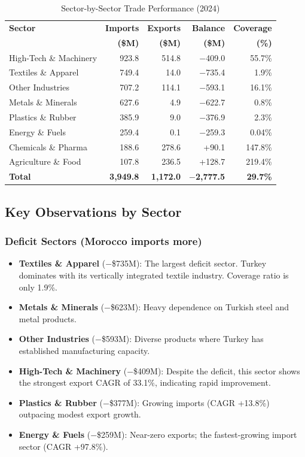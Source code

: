 \documentclass[12pt,a4paper]{article}
\begin{document}
\begin{table}[H]
\centering
\caption{Sector-by-Sector Trade Performance (2024)}
\begin{tabular}{l r r r r}
\toprule
\textbf{Sector} & \textbf{Imports} & \textbf{Exports} & \textbf{Balance} & \textbf{Coverage} \\
 & \textbf{(\$M)} & \textbf{(\$M)} & \textbf{(\$M)} & \textbf{(\%)} \\
\midrule
High-Tech \& Machinery & 923.8 & 514.8 & $-$409.0 & 55.7\% \\
Textiles \& Apparel & 749.4 & 14.0 & $-$735.4 & 1.9\% \\
Other Industries & 707.2 & 114.1 & $-$593.1 & 16.1\% \\
Metals \& Minerals & 627.6 & 4.9 & $-$622.7 & 0.8\% \\
Plastics \& Rubber & 385.9 & 9.0 & $-$376.9 & 2.3\% \\
Energy \& Fuels & 259.4 & 0.1 & $-$259.3 & 0.04\% \\
Chemicals \& Pharma & 188.6 & 278.6 & +90.1 & 147.8\% \\
Agriculture \& Food & 107.8 & 236.5 & +128.7 & 219.4\% \\
\midrule
\textbf{Total} & \textbf{3,949.8} & \textbf{1,172.0} & \textbf{$-$2,777.5} & \textbf{29.7\%} \\
\bottomrule
\end{tabular}
\end{table}

\subsection{Key Observations by Sector}

\subsubsection{Deficit Sectors (Morocco imports more)}

\begin{itemize}
\item \textbf{Textiles \& Apparel} ($-$\$735M): The largest deficit sector. Turkey dominates with its vertically integrated textile industry. Coverage ratio is only 1.9\%.
\item \textbf{Metals \& Minerals} ($-$\$623M): Heavy dependence on Turkish steel and metal products.
\item \textbf{Other Industries} ($-$\$593M): Diverse products where Turkey has established manufacturing capacity.
\item \textbf{High-Tech \& Machinery} ($-$\$409M): Despite the deficit, this sector shows the strongest export CAGR of 33.1\%, indicating rapid improvement.
\item \textbf{Plastics \& Rubber} ($-$\$377M): Growing imports (CAGR +13.8\%) outpacing modest export growth.
\item \textbf{Energy \& Fuels} ($-$\$259M): Near-zero exports; the fastest-growing import sector (CAGR +97.8\%).
\end{itemize}
\end{document}
